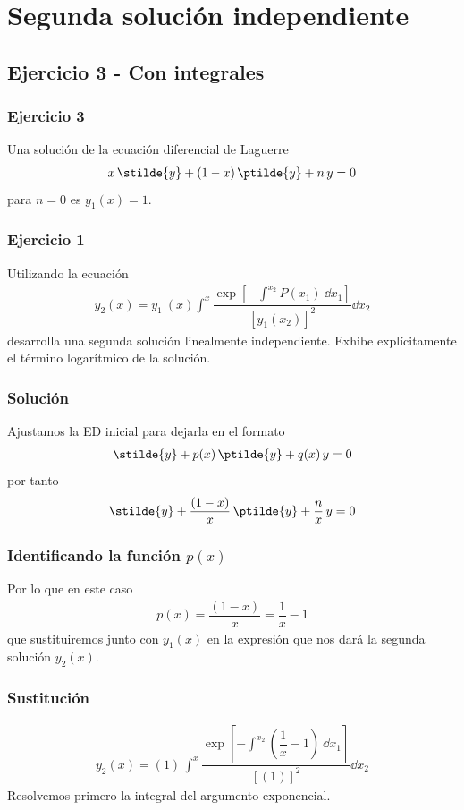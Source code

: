 \section{Segunda solución independiente}
\subsection{Ejercicio 3 - Con integrales}
\begin{frame}
\frametitle{Ejercicio 3}
Una solución de la ecuación diferencial de Laguerre
\begin{align*}
x \, \stilde{y} + (1 - x) \, \ptilde{y} + n \, y = 0
\end{align*}
para $n = 0$ es $y_{1}(x) = 1$.
\end{frame}
\begin{frame}
\frametitle{Ejercicio 1}
Utilizando la ecuación
\begin{align*}
y_{2}(x) =  y_{1} \: (x) \int^{x} \dfrac{\exp \left[ \displaystyle - \int^{x_{2}} P(x_{1}) \: \dd{x_{1}} \right]}{[y_{1}(x_{2})]^{2}} \dd{x_{2}}
\end{align*}
desarrolla una segunda solución linealmente independiente. Exhibe explícitamente el término logarítmico de la solución.
\end{frame}
\begin{frame}
\frametitle{Solución}
Ajustamos la ED inicial para dejarla en el formato
\begin{align*}
\stilde{y} + p(x) \, \ptilde{y} + q(x) \, y = 0
\end{align*}
\pause
por tanto
\begin{align*}
\stilde{y} + \dfrac{(1 - x)}{x} \, \ptilde{y} + \dfrac{n}{x} \, y = 0
\end{align*}
\end{frame}
\begin{frame}
\frametitle{Identificando la función $p(x)$}
Por lo que en este caso
\begin{align*}
p(x) = \dfrac{(1 - x)}{x} = \dfrac{1}{x} - 1
\end{align*}
que sustituiremos junto con $y_{1}(x)$ en la expresión que nos dará la segunda solución $y_{2}(x)$.
\end{frame}
\begin{frame}
\frametitle{Sustitución}
\begin{align*}
y_{2}(x) =  (1) \, \int^{x} \dfrac{\exp \left[ \displaystyle - \int^{x_{2}} \left( \dfrac{1}{x} - 1 \right) \: \dd{x_{1}} \right]}{[(1)]^{2}} \dd{x_{2}}
\end{align*}
\pause
Resolvemos primero la integral del argumento exponencial.
\end{frame}
